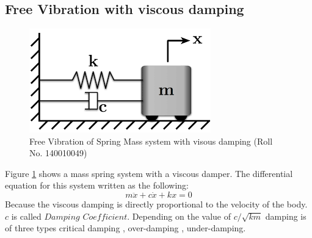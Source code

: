\documentclass[12pt, a4paper]{article}
\begin{document}
\subsection{Free Vibration with viscous damping}
\begin{figure}[h]
\includegraphics[width=0.7\textwidth]{Damped_free.png}
\caption{Free Vibration of Spring Mass system with visous damping (Roll No. 140010049)}
\label{fig:damped}
\end{figure}
Figure \ref{fig:damped} shows a mass spring system with a viscous damper. The differential equation for this system written as the following:\\
\begin{equation} 
m\ddot{x} + c\dot{x} + kx = 0
\label{damped-newton}
\end{equation}
Because the viscous damping is directly proportional to the velocity of the body. $c$ is called $Damping$ $Coefficient$. Depending on the value of $c/\sqrt{km}$ damping is of three types critical damping , over-damping , under-damping.\\
\end{document}
